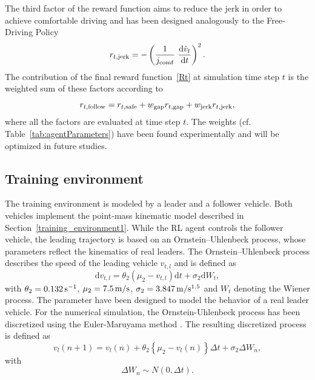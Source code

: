 \documentclass[review]{elsarticle}
\providecommand{\sub}[1]{_{\mathrm{#1}}}  %
\providecommand{\3}{{\ss}}
\begin{document}
	
	
	The third factor of the reward function aims to reduce the jerk in
	order to achieve comfortable driving and has been designed analogously to the Free-Driving Policy
	\begin{equation}
		\label{eq:r3_CFP}
		r_{t, \rm jerk} = -\left(\frac{1}{j\sub{comf}} \ \dv{\dot{v}_t}{t}\right)^2.
	\end{equation}
	The contribution of the final reward function~\eqref{Rt}  at simulation time step $t$ is the weighted
	sum of these factors according to
	\begin{equation}
		\label{rt2}
		r_{t, \rm follow} = r_{t, \rm safe} + w\sub{gap}r_{t,\rm gap}+w\sub{jerk}r_{t, \rm jerk} ,
	\end{equation}
	where all the factors are evaluated at time step $t$. The weights (cf.
	Table~\ref{tab:agentParameters}) have been found experimentally and
	will be optimized in future studies.
	
	
	
	
	\subsection{Training environment}
	\label{training_environment2}
	The training environment is modeled by a leader and a follower vehicle. Both vehicles implement the point-mass kinematic model described in Section~\ref{training_environment1}. While the RL agent controls the follower vehicle, the leading trajectory is based on an Ornstein–Uhlenbeck process, whose parameters
	reflect the kinematics of real leaders. The Ornstein–Uhlenbeck process describes
	the speed of the leading vehicle $v_{t,l}$ and is defined as 	
	\begin{equation} \label{eq:AR1}
		\mathrm{d} v_{t,l}=\theta_2\left(\mu_2-v_{t,l}\right) \mathrm{d} t+\sigma_2 \mathrm{d} W_{t},
	\end{equation}
	with $\theta_2 = \unit[0.132]{s^{-1}}$, $\mu_2 = \unit[7.5]{m/s}$, $\sigma_2 = \unit[3.847]{m/s^{1.5}}$ and $W_{t}$ denoting the Wiener process. The parameter have been designed to model the behavior of a real leader vehicle.
	For the numerical simulation, the Ornstein-Uhlenbeck process has been discretized using the Euler-Maruyama method \citep{CIRprocess}. The resulting discretized process is defined as
	\begin{equation} 
		v_{l}(n+1)=v_{l}(n)+\theta_2\left\{\mu_2-v_{l}(n)\right\} \Delta t+\sigma_2 \Delta W_{n},
	\end{equation}
	with 
	\begin{equation}
		\Delta W_{n} \sim N(0, \Delta t).
	\end{equation}
	
\end{document}
